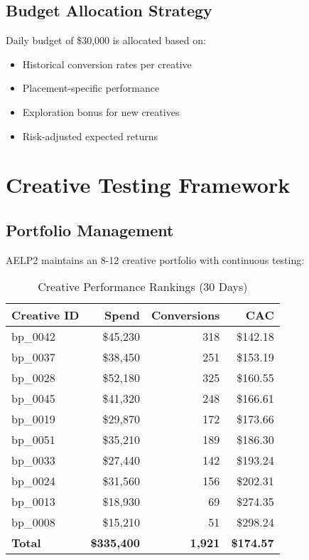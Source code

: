 \documentclass[11pt,a4paper]{report}
\begin{document}
\section{Budget Allocation Strategy}

Daily budget of \$30,000 is allocated based on:
\begin{itemize}
\item Historical conversion rates per creative
\item Placement-specific performance
\item Exploration bonus for new creatives
\item Risk-adjusted expected returns
\end{itemize}

\clearpage

\chapter{Creative Testing Framework}

\section{Portfolio Management}

AELP2 maintains an 8-12 creative portfolio with continuous testing:

\begin{table}[H]
\centering
\begin{tabular}{|l|r|r|r|}
\hline
\rowcolor{aelpblue!20}
\textbf{Creative ID} & \textbf{Spend} & \textbf{Conversions} & \textbf{CAC} \\
\hline
bp\_0042 & \$45,230 & 318 & \$142.18 \\
bp\_0037 & \$38,450 & 251 & \$153.19 \\
bp\_0028 & \$52,180 & 325 & \$160.55 \\
bp\_0045 & \$41,320 & 248 & \$166.61 \\
bp\_0019 & \$29,870 & 172 & \$173.66 \\
bp\_0051 & \$35,210 & 189 & \$186.30 \\
bp\_0033 & \$27,440 & 142 & \$193.24 \\
bp\_0024 & \$31,560 & 156 & \$202.31 \\
bp\_0013 & \$18,930 & 69 & \$274.35 \\
bp\_0008 & \$15,210 & 51 & \$298.24 \\
\hline
\textbf{Total} & \textbf{\$335,400} & \textbf{1,921} & \textbf{\$174.57} \\
\hline
\end{tabular}
\caption{Creative Performance Rankings (30 Days)}
\end{table}
\end{document}
